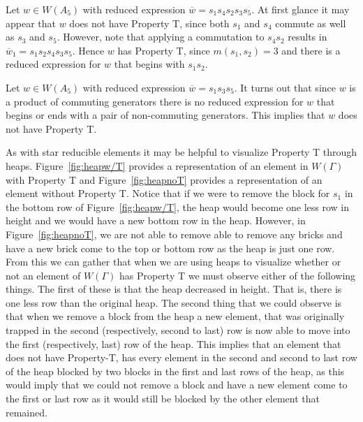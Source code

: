 \begin{example}\label{ex:prop-T}
Let $w \in W(A_5)$ with reduced expression $\overline{w}=s_1s_4s_2s_3s_5$. At first glance it may appear that $w$ does not have Property T, since both $s_1$ and $s_4$ commute as well as $s_3$ and $s_5$. However, note that applying a commutation to $s_4s_2$ results in $\overline{w}_1=s_1s_2s_4s_3s_5$. Hence $w$ has Property T, since $m(s_1,s_2)=3$ and there is a reduced expression for $w$ that begins with $s_1s_2$.	
\end{example}

\begin{example}\label{ex:tavoid}
Let $w \in W(A_5)$ with reduced expression $\overline{w}=s_1s_3s_5$. It turns out that since $w$ is a product of commuting generators there is no reduced expression for $w$ that begins or ends with a pair of non-commuting generators. This implies that $w$ does not have Property T.	
\end{example}

As with star reducible elements it may be helpful to visualize Property T through heaps. Figure~\ref{fig:heapw/T} provides a representation of an element in $W(\Gamma)$ with Property T and Figure~\ref{fig:heapnoT} provides a representation of an element without Property T. Notice that if we were to remove the block for $s_1$ in the bottom row of Figure~\ref{fig:heapw/T}, the heap would become one less row in height and we would have a new bottom row in the heap. However, in Figure~\ref{fig:heapnoT}, we are not able to remove able to remove any bricks and have a new brick come to the top or bottom row as the heap is just one row. From this we can gather that when we are using heaps to visualize whether or not an element of $W(\Gamma)$ has Property T we must observe either of the following things. The first of these is that the heap decreased in height. That is, there is one less row than the original heap. The second thing that we could observe is that when we remove a block from the heap a new element, that was originally trapped in the second (respectively, second to last) row is now able to move into the first (respectively, last) row of the heap. This implies that an element that does not have Property-T, has every element in the second and second to last row of the heap blocked by two blocks in the first and last rows of the heap, as this would imply that we could not remove a block and have a new element come to the first or last row as it would still be blocked by the other element that remained.

